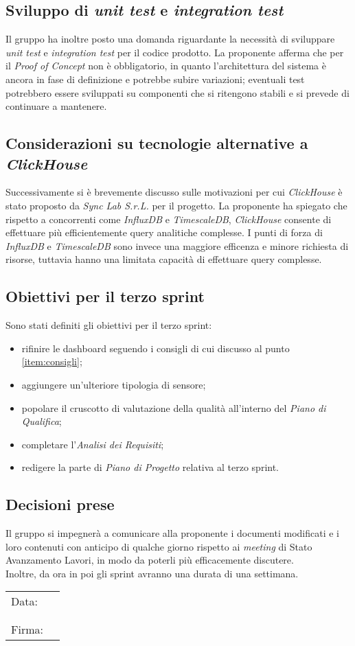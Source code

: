 \documentclass[italian,12pt]{article}
\begin{document}
\newpage
\subsection{Sviluppo di \textit{unit test} e \textit{integration test}}
Il gruppo ha inoltre posto una domanda riguardante la necessità di sviluppare \textit{unit test} e \textit{integration test} per il codice prodotto.
La proponente afferma che per il \textit{Proof of Concept} non è obbligatorio, in quanto l'architettura del sistema è ancora in fase di definizione
e potrebbe subire variazioni; eventuali test potrebbero essere sviluppati su componenti che si ritengono stabili e si prevede di continuare a mantenere.

\subsection{Considerazioni su tecnologie alternative a \textit{ClickHouse}}
Successivamente si è brevemente discusso sulle motivazioni per cui \textit{ClickHouse} è stato proposto da \textit{Sync Lab S.r.L.} per il progetto. La proponente ha spiegato che
rispetto a concorrenti come \textit{InfluxDB} e \textit{TimescaleDB}, \textit{ClickHouse}
consente di effettuare più efficientemente query analitiche complesse.
I punti di forza di \textit{InfluxDB} e \textit{TimescaleDB} sono invece una maggiore efficenza e minore richiesta di risorse, tuttavia
hanno una limitata capacità di effettuare query complesse.

\subsection{Obiettivi per il terzo sprint}
Sono stati definiti gli obiettivi per il terzo sprint:
\begin{itemize}
	\item rifinire le dashboard seguendo i consigli di cui discusso al punto \ref{item:consigli};
	\item aggiungere un'ulteriore tipologia di sensore;
	\item popolare il cruscotto di valutazione della qualità all'interno del \textit{Piano di Qualifica};
	\item completare l'\textit{Analisi dei Requisiti};
	\item redigere la parte di \textit{Piano di Progetto} relativa al terzo sprint.
\end{itemize}

\subsection{Decisioni prese}
Il gruppo si impegnerà a comunicare alla proponente i documenti modificati e i loro contenuti con anticipo di qualche giorno rispetto ai \textit{meeting}
di Stato Avanzamento Lavori, in modo da poterli più efficacemente discutere.\\
Inoltre, da ora in poi gli sprint avranno una durata di una settimana.

\newpage
\begin{table}[b]
	\begin{tabular}{@{}p{.5in}p{4in}@{}}
		Data:  & \hrulefill \\
		       &            \\
		       &            \\
		Firma: & \hrulefill \\
	\end{tabular}
\end{table}
\end{document}
